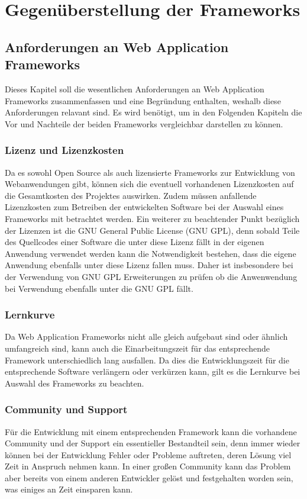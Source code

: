 \section{Gegenüberstellung der Frameworks}
\subsection{Anforderungen an Web Application Frameworks}
Dieses Kapitel soll die wesentlichen Anforderungen an Web Application Frameworks zusammenfassen und eine Begründung enthalten, weshalb diese Anforderungen relavant sind. Es wird benötigt, um in den Folgenden Kapiteln die Vor und Nachteile der beiden Frameworks vergleichbar darstellen zu können.
\subsubsection*{Lizenz und Lizenzkosten}
Da es sowohl Open Source als auch lizensierte Frameworks zur Entwicklung von Webanwendungen gibt, können sich die eventuell vorhandenen Lizenzkosten auf die Gesamtkosten des Projektes auswirken. Zudem müssen anfallende Lizenzkosten zum Betreiben der entwickelten Software bei der Auswahl eines Frameworks mit betrachtet werden.
Ein weiterer zu beachtender Punkt bezüglich der Lizenzen ist die GNU General Public License (GNU GPL), denn sobald Teile des Quellcodes einer Software die unter diese Lizenz fällt in der eigenen Anwendung verwendet werden kann die Notwendigkeit bestehen, dass die eigene Anwendung ebenfalls unter diese Lizenz fallen muss. Daher ist insbesondere bei der Verwendung von GNU GPL Erweiterungen zu prüfen ob die Anwenwendung bei Verwendung ebenfalls unter die GNU GPL fällt.
\subsubsection*{Lernkurve}
Da Web Application Frameworks nicht alle gleich aufgebaut sind oder ähnlich umfangreich sind, kann auch die Einarbeitungszeit für das entsprechende Framework unterschiedlich lang ausfallen. Da dies die Entwicklungszeit für die entsprechende Software verlängern oder verkürzen kann, gilt es die Lernkurve bei Auswahl des Frameworks zu beachten.
\subsubsection*{Community und Support}
Für die Entwicklung mit einem entsprechenden Framework kann die vorhandene Community und der Support ein essentieller Bestandteil sein, denn immer wieder können bei der Entwicklung Fehler oder Probleme auftreten, deren Lösung viel Zeit in Anspruch nehmen kann. In einer großen Community kann das Problem aber bereits von einem anderen Entwickler gelöst und festgehalten worden sein, was einiges an Zeit einsparen kann.

